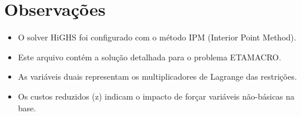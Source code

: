 \documentclass[12pt]{article}
\begin{document}
\section{Observações}

\begin{itemize}
\item O solver HiGHS foi configurado com o método IPM (Interior Point Method).
\item Este arquivo contém a solução detalhada para o problema ETAMACRO.
\item As variáveis duais representam os multiplicadores de Lagrange das restrições.
\item Os custos reduzidos (z) indicam o impacto de forçar variáveis não-básicas na base.
\end{itemize}
\end{document}
